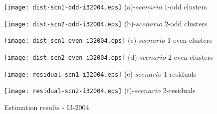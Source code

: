 \begin{figure}
     \begin{minipage}[h]{0.5\linewidth}
        \centering
        \texttt{[image: dist-scn1-odd-i32004.eps]}
				\footnotesize{(a)-$scenario$ 1-odd clusters}
     \end{minipage}
\vspace{3.00mm}
    \begin{minipage}[h]{0.5\linewidth}
       \centering
       \texttt{[image: dist-scn2-odd-i32004.eps]}
			\footnotesize{(b)-$scenario$ 2-odd clusters}
     \end{minipage}
\vspace{3.00mm}
    \begin{minipage}[h]{0.5\linewidth}
       \centering
       \texttt{[image: dist-scn1-even-i32004.eps]}
			\footnotesize{(c)-$scenario$ 1-even clusters}
     \end{minipage}
\vspace{3.00mm}
    \begin{minipage}[h]{0.5\linewidth}
       \centering
       \texttt{[image: dist-scn2-even-i32004.eps]}
			\footnotesize{(d)-$scenario$ 2-even clusters}
     \end{minipage}
\vspace{3.00mm}
    \begin{minipage}[h]{0.5\linewidth}
       \centering
       \texttt{[image: residual-scn1-i32004.eps]}
			\footnotesize{(e)-$scenario$ 1-residuals}
     \end{minipage}
\vspace{3.00mm}
    \begin{minipage}[h]{0.5\linewidth}
       \centering
       \texttt{[image: residual-scn2-i32004.eps]}
			\footnotesize{(f)-$scenario$ 2-residuals}
     \end{minipage}
		\caption{Estimation results - I3-2004.}
\label{fig11}
\end{figure}


